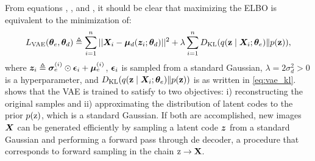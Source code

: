 From equations , , and , it should be clear that maximizing the ELBO is equivalent to the minimization of:
\begin{equation}
    \label{eq:vae_loss}
    L_{\text{VAE}}({\bm{\theta}}_e, {\bm{\theta}}_d) \triangleq \sum_{i=1}^n ||{\bm{X}}_i - {\bm{\mu}}_d({\bm{z}}_i; {\bm{\theta}}_d)||^2 + \lambda \sum_{i=1}^n D_{\mathrm{KL}}(q({\mathbf{z}} \mid {\bm{X}}_i; {\bm{\theta}}_e) \Vert p({\mathbf{z}})),
\end{equation}
where ${\bm{z}}_i \triangleq {\bm{\sigma}}_e^{(i)} \odot {\bm{\epsilon}}_i + {\bm{\mu}}_e^{(i)}$, ${\bm{\epsilon}}_i$ is sampled from a standard Gaussian, $\lambda = 2\sigma_d^2 > 0$ is a hyperparameter, and $D_{\mathrm{KL}}(q({\mathbf{z}} \mid {\bm{X}}_i; {\bm{\theta}}_e) \Vert p({\mathbf{z}}))$ is as written in \eqref{eq:vae_kl}.  shows that the VAE is trained to satisfy to two objectives: i) reconstructing the original samples and ii) approximating the distribution of latent codes to the prior $p({\textnormal{z}})$, which is a standard Gaussian. If both are accomplished, new images ${\bm{X}}$ can be generated efficiently by sampling a latent code ${\bm{z}}$ from a standard Gaussian and performing a forward pass through de decoder, a procedure that corresponds to forward sampling in the chain ${\textnormal{z}} \rightarrow {\mathbf{X}}$.